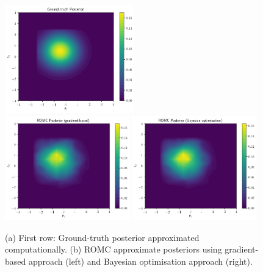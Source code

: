 \begin{figure}[h]
  \begin{center}
      \includegraphics[width=0.5\textwidth]{./Thesis/images/chapter4/ex2D_gt_posterior.png}\\
      \includegraphics[width=0.48\textwidth]{./Thesis/images/chapter4/ex2D_romc_posterior.png}
      \includegraphics[width=0.48\textwidth]{./Thesis/images/chapter4/ex2D_romc_posterior_bo.png}
    \end{center}
    \caption{(a) First row: Ground-truth posterior approximated
      computationally. (b) ROMC approximate posteriors using
      gradient-based approach (left) and Bayesian optimisation
      approach (right).}
  \label{fig:ex2_4}
\end{figure}

